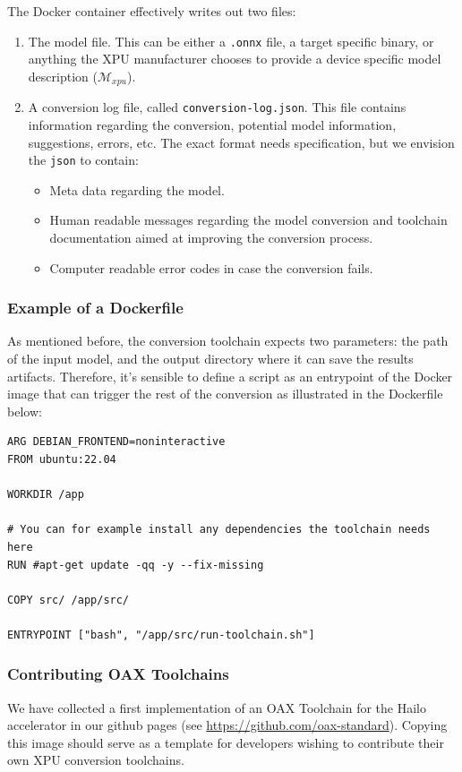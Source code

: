 \documentclass{article}
\newcommand{\oaxgit}{\href{https://github.com/oax-standard}{https://github.com/oax-standard}}
\begin{document}
The Docker container effectively writes out two files:
\begin{enumerate}
\item The model file. This can be either a \texttt{.onnx} file, a target specific binary, or anything the XPU manufacturer chooses to provide a device specific model description ($ \mathcal{M}_{xpu}$).
\item A conversion log file, called \texttt{conversion-log.json}. This file contains information regarding the conversion, potential model information, suggestions, errors, etc. The exact format needs specification, but we envision the \texttt{json} to contain:
	\begin{itemize}
		\item Meta data regarding the model.
		\item Human readable messages regarding the model conversion and toolchain documentation aimed at improving the conversion process.
		\item Computer readable error codes in case the conversion fails.
	\end{itemize}
\end{enumerate}

\subsubsection{Example of a Dockerfile}
As mentioned before, the conversion toolchain expects two parameters: the path of the input model, and the output directory where it can save the results artifacts. Therefore, it's sensible to define a script as an entrypoint of the Docker image that can trigger the rest of the conversion as illustrated in the Dockerfile below:
\begin{lstlisting}
ARG DEBIAN_FRONTEND=noninteractive
FROM ubuntu:22.04

WORKDIR /app

# You can for example install any dependencies the toolchain needs here
RUN #apt-get update -qq -y --fix-missing

COPY src/ /app/src/

ENTRYPOINT ["bash", "/app/src/run-toolchain.sh"]
\end{lstlisting}

\subsubsection{Contributing OAX Toolchains}

We have collected a first implementation of an OAX Toolchain for the Hailo accelerator in our github pages (see \oaxgit). Copying this image should serve as a template for developers wishing to contribute their own XPU conversion toolchains.
\end{document}
